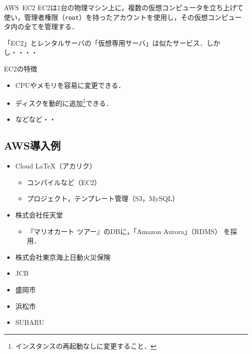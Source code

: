 \begin{frame}[t]{\ftitle}
    \begin{block}{AWS\ EC2}
        EC2は1台の物理マシン上に，複数の仮想コンピュータを立ち上げて使い，管理者権限（\texttt{root}）を持ったアカウントを使用し，その仮想コンピュータ内の全てを管理する．\hfill\cite{2015amazon}
    \end{block}
    「EC2」とレンタルサーバの「仮想専用サーバ」は似たサービス．しかし・・・・
    \begin{exampleblock}{EC2の特徴}
        \begin{itemize}
            \item CPUやメモリを容易に変更できる．\hfill{}
            \item ディスクを動的に追加\footnote{インスタンスの再起動なしに変更すること．}できる．
                  \item[]\hfill などなど・・
        \end{itemize}
    \end{exampleblock}
\end{frame}
\subsection{AWS導入例}
\begin{frame}[t]{\ftitle}
    \begin{itemize}
        \item Cloud LaTeX（アカリク）
              \begin{itemize}
                  \item コンパイルなど（EC2）
                  \item プロジェクト，テンプレート管理（S3，MySQL）
              \end{itemize}
        \item 株式会社任天堂
              \begin{itemize}
                  \item 『マリオカート ツアー』のDBに，「Amazon Aurora」（RDMS） を採用．
              \end{itemize}
        \item 株式会社東京海上日動火災保険
        \item JCB
        \item 盛岡市
        \item 浜松市
        \item SUBARU
    \end{itemize}
    \hfill\cite{導入事例}
\end{frame}